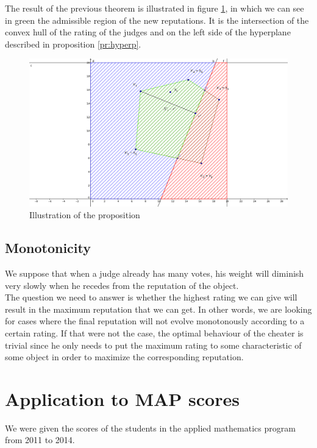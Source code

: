\documentclass[12pt,a4paper]{article}
\begin{document}
The result of the previous theorem is illustrated in figure \ref{hyperp}, in which we can see in green the admissible region of the new reputations. It is the intersection of the convex hull of the rating of the judges and on the left side of the hyperplane
described in proposition \ref{pr:hyperp}.
\begin{figure}[h!]
\centering
\includegraphics[width = 12cm]{geogebra/Hyperplane.png}
\caption{\label{hyperp}Illustration of the proposition}
\end{figure}
\FloatBarrier
\subsection{Monotonicity}
We suppose that when a judge already has many votes, his weight will diminish very slowly when he recedes from the reputation of the object.\\
The question we need to answer is whether the highest rating we can give will result in the maximum reputation that we can get. In other words, we are looking for cases where the final reputation will not evolve monotonously according to a certain rating. If that were not the case, the optimal behaviour of the cheater is trivial since he only needs to put the maximum rating to some characteristic of some object in order to maximize the corresponding reputation.




\section*{Application to MAP scores}
We were given the scores of the students in the applied mathematics program from 2011 to 2014.
\FloatBarrier
\end{document}
